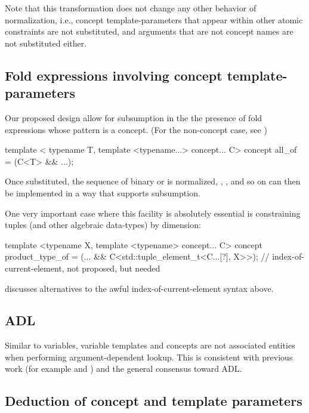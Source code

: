 \documentclass{wg21}
\begin{document}
Note that this transformation does not change any other behavior of normalization, i.e., concept template-parameters that appear within other atomic constraints
are not substituted, and arguments that are not concept names are not substituted either.

\subsection{Fold expressions involving concept template-parameters}

Our proposed design allow for subsumption in the the presence of fold expressions whose pattern is a concept.
(For the non-concept case, see )


\begin{colorblock}
template <
    typename T,
    template <typename...> concept... C>
concept all_of = (C<T> && ...);
\end{colorblock}

Once substituted, the sequence of binary \tcode{\&\&} or \tcode{||} is normalized,
, , and so on can then be implemented in a way that supports subsumption.

One very important case where this facility is absolutely essential is constraining tuples (and other algebraic data-types) by dimension:

\begin{colorblock}
template <typename X, template <typename> concept... C>
concept product_type_of = (... && C<std::tuple_element_t<C...[?], X>>);
//   index-of-current-element, not proposed, but needed  ~~~~~~~
\end{colorblock}

 discusses alternatives to the awful index-of-current-element syntax above.

\subsection{ADL}

Similar to variables, variable templates and concepts are not associated entities when performing argument-dependent lookup.
This is consistent with previous work (for example  and ) and the general consensus toward ADL.

\subsection{Deduction of concept and template parameters}
\end{document}

